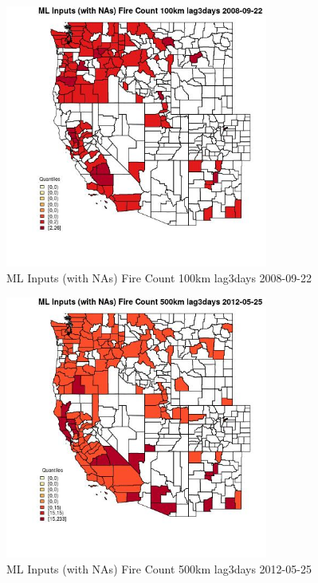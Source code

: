 \begin{figure} 
\centering  
\includegraphics[width=0.77\textwidth]{Code_Outputs/Report_ML_input_PM25_Step4_part_e_de_duplicated_aves_compiled_2019-05-18wNAs_CountyFire_Count_100km_lag3daysMean2008-09-22_2008-09-22.jpg} 
\caption{\label{fig:Report_ML_input_PM25_Step4_part_e_de_duplicated_aves_compiled_2019-05-18wNAsCountyFire_Count_100km_lag3daysMean2008-09-22_2008-09-22}ML Inputs (with NAs) Fire Count 100km lag3days 2008-09-22} 
\end{figure} 
 

\begin{figure} 
\centering  
\includegraphics[width=0.77\textwidth]{Code_Outputs/Report_ML_input_PM25_Step4_part_e_de_duplicated_aves_compiled_2019-05-18wNAs_CountyFire_Count_500km_lag3daysMean2012-05-25_2012-05-25.jpg} 
\caption{\label{fig:Report_ML_input_PM25_Step4_part_e_de_duplicated_aves_compiled_2019-05-18wNAsCountyFire_Count_500km_lag3daysMean2012-05-25_2012-05-25}ML Inputs (with NAs) Fire Count 500km lag3days 2012-05-25} 
\end{figure} 
 

